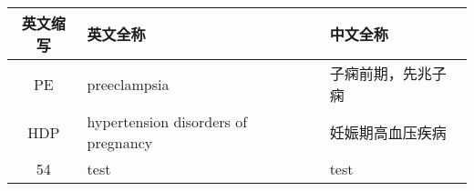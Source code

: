 \cleardoublepage
{}
\begin{table}[htbp]
    \centering
    \fontsize{10}{6}
    \begin{tabularx}{\linewidth}{cX<{\centering}X<{\centering}}
        \toprule \textbf{英文缩写}&\textbf{英文全称}&\textbf{中文全称}\\
        \midrule PE&preeclampsia&子痫前期，先兆子痫\\
        HDP&hypertension disorders of pregnancy&妊娠期高血压疾病\\
        {\color{red} 54}&test&test\\
        \bottomrule
    \end{tabularx}
\end{table}
